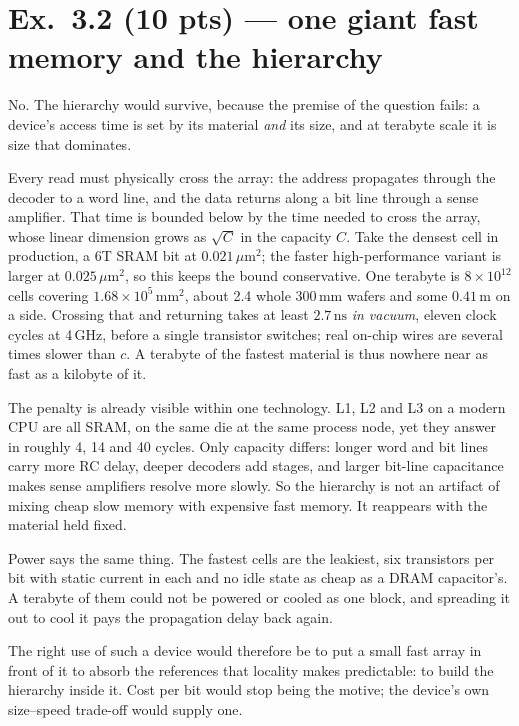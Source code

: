 \section*{Ex.~3.2 \quad (10 pts) --- one giant fast memory and the hierarchy}

No. The hierarchy would survive, because the premise of the question fails: a
device's access time is set by its material \emph{and} its size, and at terabyte
scale it is size that dominates.

Every read must physically cross the array: the address propagates through the
decoder to a word line, and the data returns along a bit line through a sense
amplifier. That time is bounded below by the time needed to cross the array, whose
linear dimension grows as $\sqrt{C}$ in the capacity $C$. Take the densest cell in
production, a 6T SRAM bit at $0.021\,\mu\mathrm{m}^2$; the faster high-performance
variant is larger at $0.025\,\mu\mathrm{m}^2$, so this keeps the bound conservative.
One terabyte is $8\times10^{12}$ cells covering $1.68\times10^{5}\,\mathrm{mm}^2$,
about 2.4 whole 300\,mm wafers and some $0.41\,\mathrm{m}$ on a side. Crossing that
and returning takes at least $2.7\,\mathrm{ns}$ \emph{in vacuum}, eleven clock
cycles at 4\,GHz, before a single transistor switches; real on-chip wires are
several times slower than $c$. A terabyte of the fastest material is thus nowhere
near as fast as a kilobyte of it.

The penalty is already visible within one technology. L1, L2 and L3 on a modern CPU
are all SRAM, on the same die at the same process node, yet they answer in roughly
4, 14 and 40 cycles. Only capacity differs: longer word and bit lines carry more RC
delay, deeper decoders add stages, and larger bit-line capacitance makes sense
amplifiers resolve more slowly. So the hierarchy is not an artifact of mixing cheap
slow memory with expensive fast memory. It reappears with the material held fixed.

Power says the same thing. The fastest cells are the leakiest, six transistors per
bit with static current in each and no idle state as cheap as a DRAM capacitor's. A
terabyte of them could not be powered or cooled as one block, and spreading it out
to cool it pays the propagation delay back again.

The right use of such a device would therefore be to put a small fast array in front
of it to absorb the references that locality makes predictable: to build the
hierarchy inside it. Cost per bit would stop being the motive; the device's own
size--speed trade-off would supply one.

